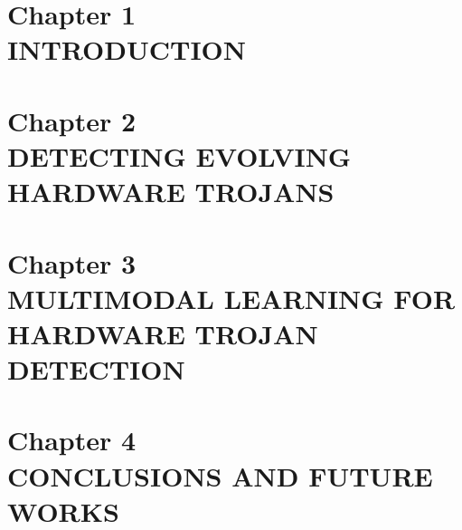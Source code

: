 \documentclass[letterpaper, 12pt]{article}
\begin{document}
\doublespacing
\begin{center}
\tableofcontents
\newpage

{}
\listoftables
\newpage

{}
\listoffigures
\newpage


{}
\section*{Chapter 1 \\INTRODUCTION}

\newpage

{}
\section*{Chapter 2 \\ DETECTING EVOLVING HARDWARE TROJANS}

\newpage

{}
\section*{Chapter 3 \\ MULTIMODAL LEARNING FOR HARDWARE TROJAN DETECTION}

\newpage

\iffalse 
\phantomsection
\addcontentsline{toc}{section}{4. SECURING CHAOTIC COMMUNICATION WITH MEMRISTORS}
\section*{Chapter 4 \\ SECURING CHAOTIC COMMUNICATION WITH MEMRISTORS}

\newpage
\fi 

{}
\section*{Chapter 4 \\ CONCLUSIONS AND FUTURE WORKS }

\newpage



\end{center}
\end{document}
